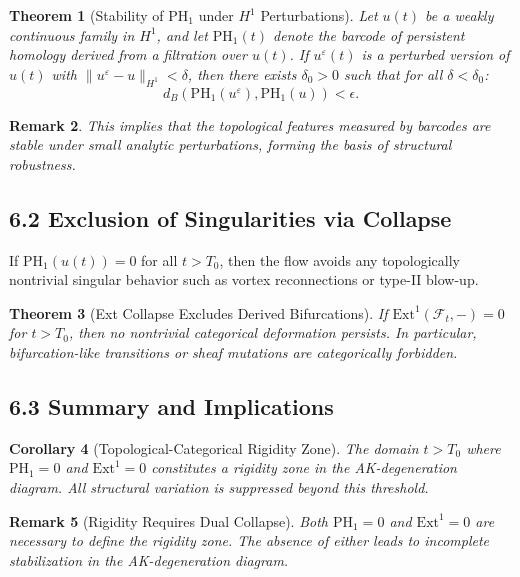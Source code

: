 \documentclass[11pt]{article}
\newtheorem{theorem}{Theorem}[section]
\newtheorem{remark}[theorem]{Remark}
\newtheorem{corollary}[theorem]{Corollary}
\begin{document}
\begin{theorem}[Stability of PH$_1$ under $H^1$ Perturbations]
Let $u(t)$ be a weakly continuous family in $H^1$, and let $\mathrm{PH}_1(t)$ denote the barcode of persistent homology derived from a filtration over $u(t)$. If $u^\varepsilon(t)$ is a perturbed version of $u(t)$ with $\|u^\varepsilon - u\|_{H^1} < \delta$, then there exists $\delta_0 > 0$ such that for all $\delta < \delta_0$:
\[
d_B(\mathrm{PH}_1(u^\varepsilon), \mathrm{PH}_1(u)) < \epsilon.
\]
\end{theorem}

\begin{remark}
This implies that the topological features measured by barcodes are stable under small analytic perturbations, forming the basis of structural robustness.
\end{remark}

\subsection{6.2 Exclusion of Singularities via Collapse}

\begin{proposition}
If $\mathrm{PH}_1(u(t)) = 0$ for all $t > T_0$, then the flow avoids any topologically nontrivial singular behavior such as vortex reconnections or type-II blow-up.
\end{proposition}

\begin{theorem}[Ext Collapse Excludes Derived Bifurcations]
If $\mathrm{Ext}^1(\mathcal{F}_t, -) = 0$ for $t > T_0$, then no nontrivial categorical deformation persists. In particular, bifurcation-like transitions or sheaf mutations are categorically forbidden.
\end{theorem}

\subsection{6.3 Summary and Implications}

\begin{corollary}[Topological-Categorical Rigidity Zone]
The domain $t > T_0$ where $\mathrm{PH}_1 = 0$ and $\mathrm{Ext}^1 = 0$ constitutes a rigidity zone in the AK-degeneration diagram. All structural variation is suppressed beyond this threshold.
\end{corollary}

\begin{remark}[Rigidity Requires Dual Collapse]
Both $\mathrm{PH}_1 = 0$ and $\mathrm{Ext}^1 = 0$ are necessary to define the rigidity zone. The absence of either leads to incomplete stabilization in the AK-degeneration diagram.
\end{remark}
\end{document}
